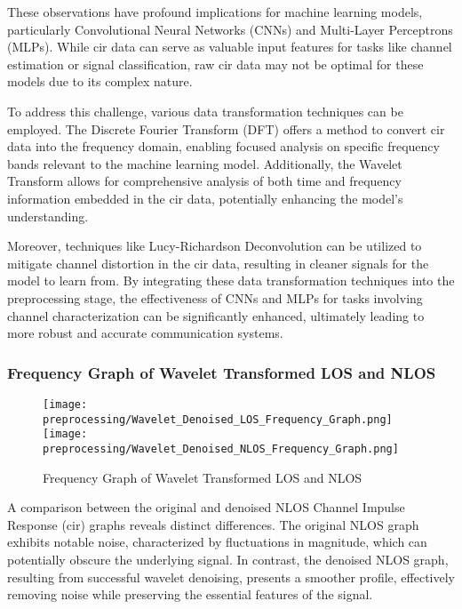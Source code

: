 These observations have profound implications for machine learning models, particularly Convolutional Neural Networks (CNNs) and Multi-Layer Perceptrons (MLPs). While \gls{cir} data can serve as valuable input features for tasks like channel estimation or signal classification, raw \gls{cir} data may not be optimal for these models due to its complex nature.

To address this challenge, various data transformation techniques can be employed. The Discrete Fourier Transform (DFT) offers a method to convert \gls{cir} data into the frequency domain, enabling focused analysis on specific frequency bands relevant to the machine learning model. Additionally, the Wavelet Transform allows for comprehensive analysis of both time and frequency information embedded in the \gls{cir} data, potentially enhancing the model's understanding.

Moreover, techniques like Lucy-Richardson Deconvolution can be utilized to mitigate channel distortion in the \gls{cir} data, resulting in cleaner signals for the model to learn from. By integrating these data transformation techniques into the preprocessing stage, the effectiveness of CNNs and MLPs for tasks involving channel characterization can be significantly enhanced, ultimately leading to more robust and accurate communication systems.



\subsubsection{Frequency Graph of Wavelet Transformed LOS and NLOS}\label{frequency_graph_wavelet}

\begin{figure}[H] 
  \centering
  \texttt{[image: preprocessing/Wavelet\_Denoised\_LOS\_Frequency\_Graph.png]}
  \texttt{[image: preprocessing/Wavelet\_Denoised\_NLOS\_Frequency\_Graph.png]}
  \caption{Frequency Graph of Wavelet Transformed LOS and NLOS}\label{fig:frequency_graph_wavelet}
\end{figure}

A comparison between the original and denoised NLOS Channel Impulse Response (\gls{cir}) graphs reveals distinct differences. The original NLOS graph exhibits notable noise, characterized by fluctuations in magnitude, which can potentially obscure the underlying signal. In contrast, the denoised NLOS graph, resulting from successful wavelet denoising, presents a smoother profile, effectively removing noise while preserving the essential features of the signal.

